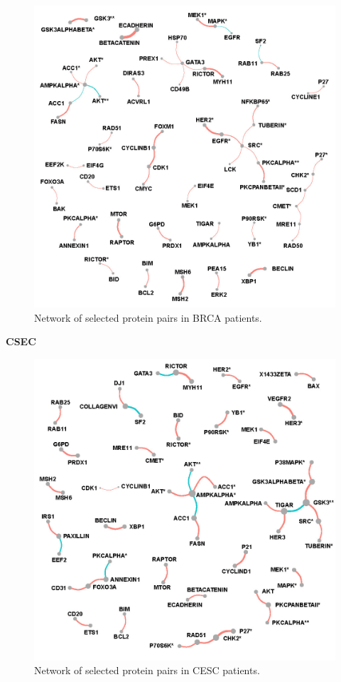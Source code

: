 \documentclass[
]{book}
\begin{document}
\begin{figure}

{\centering \includegraphics[width=0.7\linewidth]{images/pan_fullnet_brca} 

}

\caption{Network of selected protein pairs in BRCA patients.}\label{fig:brcafullnet}
\end{figure}

\textbf{CSEC}

\begin{figure}

{\centering \includegraphics[width=0.7\linewidth]{images/pan_fullnet_cesc} 

}

\caption{Network of selected protein pairs in CESC patients.}\label{fig:cescfullnet}
\end{figure}
\end{document}
